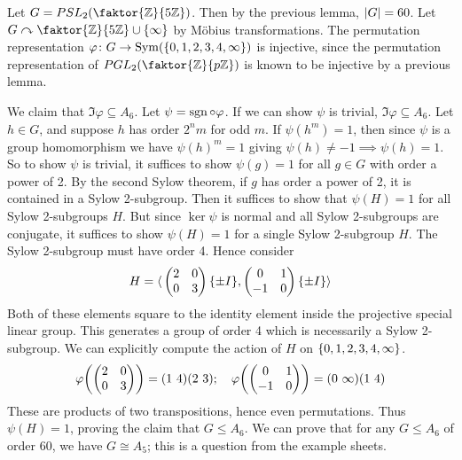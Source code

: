 \begin{example}
	Let \( G = PSL_2\qty(\faktor{\mathbb Z}{5\mathbb Z}) \).
	Then by the previous lemma, \( \abs{G} = 60 \).
	Let \( G \acts \faktor{\mathbb Z}{5\mathbb Z} \cup \qty{\infty} \) by M\"obius transformations.
	The permutation representation \( \varphi \colon G \to \operatorname{Sym}(\qty{0,1,2,3,4,\infty}) \) is injective, since the permutation representation of \( PGL_2\qty(\faktor{\mathbb Z}{p\mathbb Z}) \) is known to be injective by a previous lemma.

	We claim that \( \Im \varphi \subseteq A_6 \).
	Let \( \psi = \operatorname{sgn} \circ \varphi \).
	If we can show \( \psi \) is trivial, \( \Im \varphi \subseteq A_6 \).
	Let \( h\in G \), and suppose \( h \) has order \( 2^n m \) for odd \( m \).
	If \( \psi(h^m) = 1 \), then since \( \psi \) is a group homomorphism we have \( \psi(h)^m = 1 \) giving \( \psi(h) \neq -1 \implies \psi(h) = 1 \).
	So to show \( \psi \) is trivial, it suffices to show \( \psi(g) = 1 \) for all \( g \in G \) with order a power of 2.
	By the second Sylow theorem, if \( g \) has order a power of 2, it is contained in a Sylow 2-subgroup.
	Then it suffices to show that \( \psi(H) = 1 \) for all Sylow 2-subgroups \( H \).
	But since \( \ker \psi \) is normal and all Sylow 2-subgroups are conjugate, it suffices to show \( \psi(H) = 1 \) for a single Sylow 2-subgroup \( H \).
	The Sylow 2-subgroup must have order 4.
	Hence consider
	\[
		H = \langle{}  \begin{pmatrix}
				2 & 0 \\
				0 & 3
			\end{pmatrix} \qty{\pm I}, \begin{pmatrix}
				0  & 1 \\
				-1 & 0
			\end{pmatrix} \qty{\pm I}  \rangle
	\]
	Both of these elements square to the identity element inside the projective special linear group.
	This generates a group of order 4 which is necessarily a Sylow 2-subgroup.
	We can explicitly compute the action of \( H \) on \( \qty{0,1,2,3,4,\infty} \).
	\[
		\varphi\qty(\begin{pmatrix}
				2 & 0 \\
				0 & 3
			\end{pmatrix}) = (1\ 4)(2\ 3);\quad \varphi\qty(\begin{pmatrix}
				0  & 1 \\
				-1 & 0
			\end{pmatrix}) = (0\ \infty)(1\ 4)
	\]
	These are products of two transpositions, hence even permutations.
	Thus \( \psi(H) = 1 \), proving the claim that \( G \leq A_6 \).
	We can prove that for any \( G \leq A_6 \) of order 60, we have \( G \cong A_5 \); this is a question from the example sheets.
\end{example}

